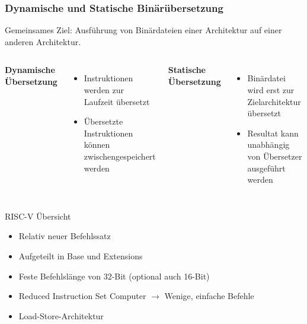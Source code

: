 \begin{frame}
    \frametitle{Dynamische und Statische Binärübersetzung}{}


    \vspace{2em}
    Gemeinsames Ziel: Ausführung von Binärdateien einer Architektur auf einer anderen Architektur.
    \pause

    \vspace{1.25cm}

    \begin{columns}[t]
        \textbf{Dynamische Übersetzung}
        \begin{itemize}
            \vspace{1em}
            \setlength{\itemsep}{1em}
            \item Instruktionen werden zur Laufzeit übersetzt
            \item Übersetzte Instruktionen können zwischengespeichert werden
        \end{itemize}

        \textbf{Statische Übersetzung}
        \begin{itemize}
            \vspace{1em}
            \setlength{\itemsep}{1em}
            \item Binärdatei wird erst zur Zielarchitektur übersetzt
            \item Resultat kann unabhängig von Übersetzer ausgeführt werden
        \end{itemize}
    \end{columns}
\end{frame}

\begin{frame}{RISC-V Übersicht}
    \vspace{1.25cm}
    \begin{itemize}
        \setlength\itemsep{0.8em}
        \item Relativ neuer Befehlssatz
        \item Aufgeteilt in Base und Extensions
        \item Feste Befehlslänge von 32-Bit (optional auch 16-Bit)
        \item Reduced Instruction Set Computer $\rightarrow$ Wenige, einfache Befehle
        \item Load-Store-Architektur
    \end{itemize}
\end{frame}

